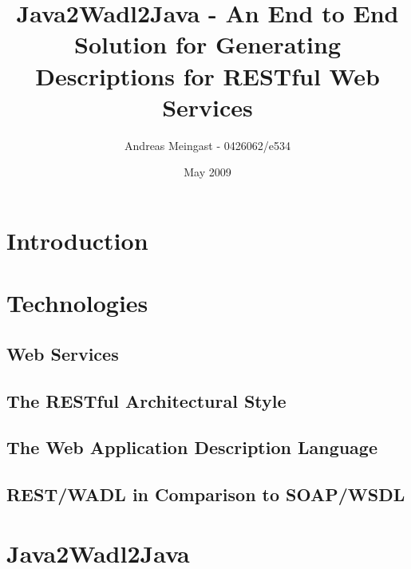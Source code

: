 \documentclass[a4paper,12pt]{article}
\begin{document}
\title{Java2Wadl2Java - An End to End Solution for Generating Descriptions for RESTful Web Services}
\author{Andreas Meingast - 0426062/e534}

\date{May 2009}

\maketitle

\vspace{6cm}

\begin{abstract}

\end{abstract}

\newpage

\tableofcontents

\newpage

\section{Introduction}


\section{Technologies}

\subsection{Web Services}


\subsection{The RESTful Architectural Style}


\subsection{The  Web Application Description Language}


\subsection{REST/WADL in Comparison to SOAP/WSDL}


\section{Java2Wadl2Java}
\end{document}
